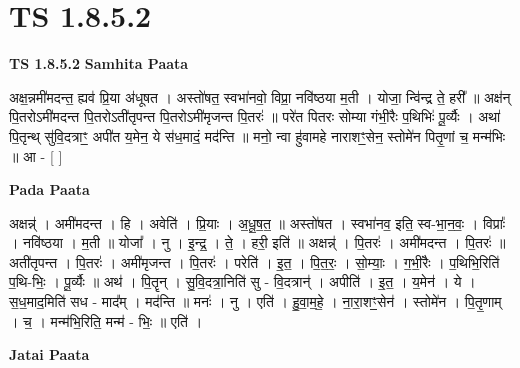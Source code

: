 \documentclass[17pt]{extarticle}
\begin{document}
\section{ TS 1.8.5.2 }

\textbf{TS 1.8.5.2 } \newline
\textbf{Samhita Paata} \newline

अक्ष॒न्नमी॑मदन्त॒ ह्यव॑ प्रि॒या अ॑धूषत । अस्तो॑षत॒ स्वभा॑नवो॒ विप्रा॒ नवि॑ष्ठया म॒ती । योजा॒ न्वि॑न्द्र ते॒ हरी᳚ ॥ अक्ष॑न् पि॒तरोऽमी॑मदन्त पि॒तरोऽती॑तृपन्त पि॒तरोऽमी॑मृजन्त पि॒तरः॑ ॥ परे॑त पितरः सोम्या गंभी॒रैः प॒थिभिः॑ पू॒र्व्यैः । अथा॑ पि॒तृन्थ् सु॑वि॒दत्राꣳ॒॒ अपी॑त य॒मेन॒ ये स॑ध॒मादं॒ मद॑न्ति ॥ मनो॒ न्वा हु॑वामहे नाराशꣳ॒॒सेन॒ स्तोमे॑न पितृ॒णां च॒ मन्म॑भिः ॥ आ - [ ] \newline

\textbf{Pada Paata} \newline

अक्षन्न्॑ । अमी॑मदन्त । हि । अवेति॑ । प्रि॒याः । अ॒धू॒ष॒त॒ ॥ अस्तो॑षत । स्वभा॑नव॒ इति॒ स्व-भा॒न॒वः॒ । विप्राः᳚ । नवि॑ष्ठया । म॒ती ॥ योजा᳚ । नु । इ॒न्द्र॒ । ते॒ । हरी॒ इति॑ ॥ अक्षन्न्॑ । पि॒तरः॑ । अमी॑मदन्त । पि॒तरः॑ ॥ अती॑तृपन्त । पि॒तरः॑ । अमी॑मृजन्त । पि॒तरः॑ । परेति॑ । इ॒त॒ । पि॒त॒रः॒ । सो॒म्याः॒ । ग॒भीं॒रैः । प॒थिभि॒रिति॑ प॒थि-भिः॒ । पू॒र्व्यैः ॥ अथ॑ । पि॒तॄन् । सु॒वि॒दत्रा॒निति॑ सु - वि॒दत्रान्॑ । अपीति॑ । इ॒त॒ । य॒मेन॑ । ये । स॒ध॒माद॒मिति॑ सध - माद᳚म् । मद॑न्ति ॥ मनः॑ । नु । एति॑ । हु॒वा॒म॒हे॒ । ना॒रा॒शꣳ॒॒सेन॑ । स्तोमे॑न । पि॒तृ॒णाम् । च॒ । मन्म॑भि॒रिति॒ मन्म॑ - भिः॒ ॥ एति॑ ।  \newline



\textbf{Jatai Paata} \newline
\end{document}

